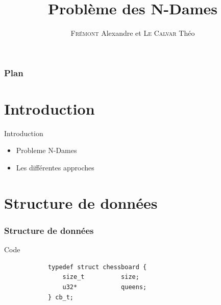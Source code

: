 \documentclass[9pt,a4paper]{beamer}
\author{\textsc{Frémont} Alexandre et \textsc{Le Calvar} Théo}
\title{Problème des N-Dames}
\begin{document}
\lstset{style=customc}

\begin{frame}
\titlepage
\end{frame}

\begin{frame}
	\frametitle{Plan}
	\tableofcontents
\end{frame}

\section{Introduction}
\begin{frame}

	\begin{block}{Introduction}

	\begin{itemize}
		\item{Probleme N-Dames}

		\item{Les différentes approches}
	\end{itemize}

	\end{block}

\end{frame}

\section{Structure de données}
\begin{frame}[fragile]
	\frametitle{Structure de données}
	\begin{block}{Code}
		\begin{lstlisting}
			typedef struct chessboard {
				size_t          size;
				u32*            queens;
			} cb_t;
		\end{lstlisting}

	\end{block}
\end{frame}
\end{document}
